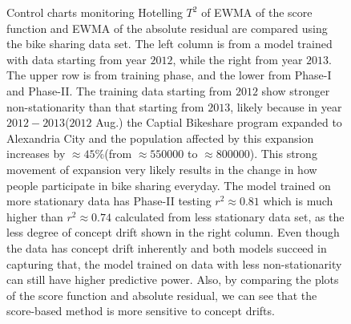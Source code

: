 \documentclass[twoside,11pt]{article}
\begin{document}
\begin{figure}[!htbp]
{Control charts monitoring Hotelling $T^2$ of EWMA of the score function and EWMA of the absolute residual are compared using the bike sharing data set. The left column is from a model trained with data starting from year $2012$, while the right from year $2013$. The upper row is from training phase, and the lower from Phase-I and Phase-II. The training data starting from $2012$ show stronger non-stationarity than that starting from $2013$, likely because in year $2012-2013$($2012$ Aug.) the Captial Bikeshare program expanded to Alexandria City and the population affected by this expansion increases by $\approx45\%$(from $\approx550000$ to $\approx800000$). This strong movement of expansion very likely results in the change in how people participate in bike sharing everyday. The model trained on more stationary data has Phase-II testing $r^2\approx0.81$ which is much higher than $r^2\approx0.74$ calculated from less stationary data set, as the less degree of concept drift shown in the right column. Even though the data has concept drift inherently and both models succeed in capturing that, the model trained on data with less non-stationarity can still have higher predictive power. Also, by comparing the plots of the score function and absolute residual, we can see that the score-based method is more sensitive to concept drifts.
}
\label{fig:bike_sharing}
\end{figure}
\end{document}

